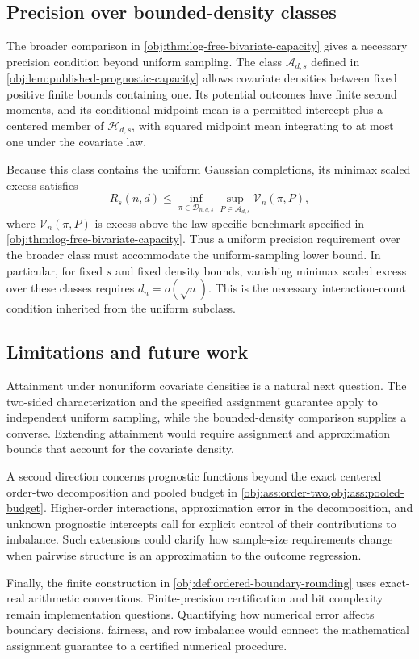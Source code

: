 \subsection{Precision over bounded-density classes}

The broader comparison in \cref{obj:thm:log-free-bivariate-capacity} gives a necessary precision condition beyond uniform sampling. The class \(\mathcal A_{d,s}\) defined in \cref{obj:lem:published-prognostic-capacity} allows covariate densities between fixed positive finite bounds containing one. Its potential outcomes have finite second moments, and its conditional midpoint mean is a permitted intercept plus a centered member of \(\mathcal H_{d,s}\), with squared midpoint mean integrating to at most one under the covariate law.

Because this class contains the uniform Gaussian completions, its minimax scaled excess satisfies
\[
R_s(n,d)
\leq
\inf_{\pi\in\mathcal D_{n,d,s}}
\sup_{P\in\mathcal A_{d,s}}\mathcal V_n(\pi,P),
\]
where \(\mathcal V_n(\pi,P)\) is excess above the law-specific benchmark specified in \cref{obj:thm:log-free-bivariate-capacity}. Thus a uniform precision requirement over the broader class must accommodate the uniform-sampling lower bound. In particular, for fixed \(s\) and fixed density bounds, vanishing minimax scaled excess over these classes requires \(d_n=o(\sqrt n)\). This is the necessary interaction-count condition inherited from the uniform subclass.

\subsection{Limitations and future work}

Attainment under nonuniform covariate densities is a natural next question. The two-sided characterization and the specified assignment guarantee apply to independent uniform sampling, while the bounded-density comparison supplies a converse. Extending attainment would require assignment and approximation bounds that account for the covariate density.

A second direction concerns prognostic functions beyond the exact centered order-two decomposition and pooled budget in \cref{obj:ass:order-two,obj:ass:pooled-budget}. Higher-order interactions, approximation error in the decomposition, and unknown prognostic intercepts call for explicit control of their contributions to imbalance. Such extensions could clarify how sample-size requirements change when pairwise structure is an approximation to the outcome regression.

Finally, the finite construction in \cref{obj:def:ordered-boundary-rounding} uses exact-real arithmetic conventions. Finite-precision certification and bit complexity remain implementation questions. Quantifying how numerical error affects boundary decisions, fairness, and row imbalance would connect the mathematical assignment guarantee to a certified numerical procedure.
